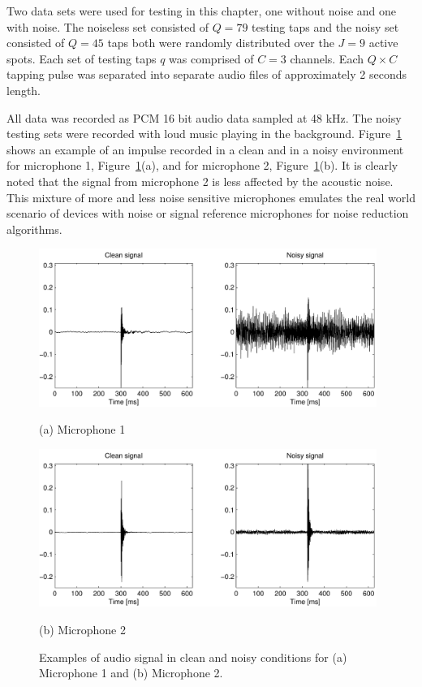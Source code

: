 Two data sets were used for testing in this chapter, one without noise and one with noise. The noiseless set consisted of $Q=79$ testing taps and the noisy set consisted of $Q=45$ taps both were randomly distributed over the $J=9$ active spots. Each set of testing taps $q$ was comprised of $C=3$ channels. Each $Q \times C$ tapping pulse was separated into separate audio files of approximately 2 seconds length.

All data was recorded as PCM 16 bit audio data sampled at 48 kHz. The noisy testing sets were recorded with loud music playing in the background. Figure~\ref{fig:NoisyMicSignalsCompare} shows an example of an impulse recorded in a clean and in a noisy environment for microphone 1, Figure~\ref{fig:NoisyMicSignalsCompare}(a), and for microphone 2, Figure~\ref{fig:NoisyMicSignalsCompare}(b). It is clearly noted that the signal from microphone 2 is less affected by the acoustic noise. This mixture of more and less noise sensitive microphones emulates the real world scenario of devices with noise or signal reference microphones for noise reduction algorithms.

\begin{figure}[t]
\begin{minipage}[b]{1.0\linewidth}
  \centering
  \centerline{\includegraphics[width=11cm]{NoiseCompare1}}%
  \centerline{(a) Microphone 1}\medskip
\end{minipage}
\begin{minipage}[b]{1.0\linewidth}
  \centering
  \centerline{\includegraphics[width=11cm]{NoiseCompare2}}%
  \centerline{(b) Microphone 2}\medskip
\end{minipage}
\caption{Examples of audio signal in clean and noisy conditions for (a) Microphone 1 and (b) Microphone 2.}
\label{fig:NoisyMicSignalsCompare}
\end{figure}

